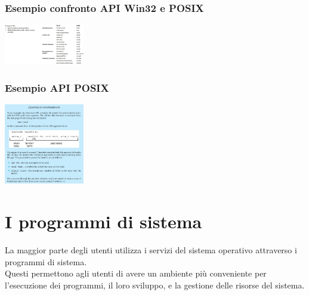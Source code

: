 \begin{description}
\subsubsection{Esempio confronto API Win32 e POSIX}
\begin{center}
    \includegraphics[width=35mm]{images/SO/SO_chiamatedisistema_API_es1.jpg}
\end{center}

\subsubsection{Esempio API POSIX}
\begin{center}
    \includegraphics[width=35mm]{images/SO/SO_chiamatedisistema_API_es2.jpg}
\end{center}

\section{I programmi di sistema}
La maggior parte degli utenti utilizza i servizi del sistema operativo attraverso i programmi di sistema.\\
Questi permettono agli utenti di avere un ambiente più conveniente per l'esecuzione dei programmi, il loro sviluppo, e la gestione delle risorse del sistema.

\end{description}
